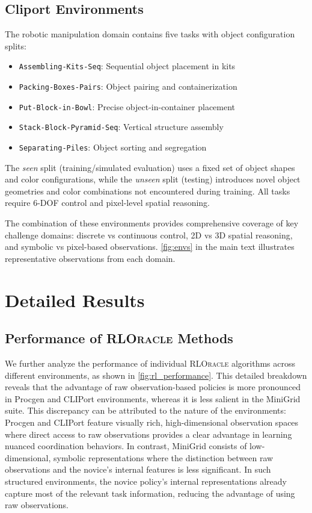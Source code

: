 \subsection{Cliport Environments}
The robotic manipulation domain contains five tasks with object configuration splits:

\begin{itemize}
\item \texttt{Assembling-Kits-Seq}: Sequential object placement in kits
\item \texttt{Packing-Boxes-Pairs}: Object pairing and containerization
\item \texttt{Put-Block-in-Bowl}: Precise object-in-container placement
\item \texttt{Stack-Block-Pyramid-Seq}: Vertical structure assembly
\item \texttt{Separating-Piles}: Object sorting and segregation
\end{itemize}

The \textit{seen} split (training/simulated evaluation) uses a fixed set of object shapes and color configurations, while the \textit{unseen} split (testing) introduces novel object geometries and color combinations not encountered during training. All tasks require $6$-DOF control and pixel-level spatial reasoning.

The combination of these environments provides comprehensive coverage of key challenge domains: discrete vs continuous control, 2D vs 3D spatial reasoning, and symbolic vs pixel-based observations. \autoref{fig:envs} in the main text illustrates representative observations from each domain.


\clearpage

\section{Detailed Results}

\subsection{Performance of \textsc{RLOracle} Methods} \label{app:exp_rloracle}

We further analyze the performance of individual \textsc{RLOracle} algorithms across different environments, as shown in \autoref{fig:rl_performance}. This detailed breakdown reveals that the advantage of raw observation-based policies is more pronounced in Procgen and CLIPort environments, whereas it is less salient in the MiniGrid suite. This discrepancy can be attributed to the nature of the environments: Procgen and CLIPort feature visually rich, high-dimensional observation spaces where direct access to raw observations provides a clear advantage in learning nuanced coordination behaviors. In contrast, MiniGrid consists of low-dimensional, symbolic representations where the distinction between raw observations and the novice’s internal features is less significant. In such structured environments, the novice policy’s internal representations already capture most of the relevant task information, reducing the advantage of using raw observations.

